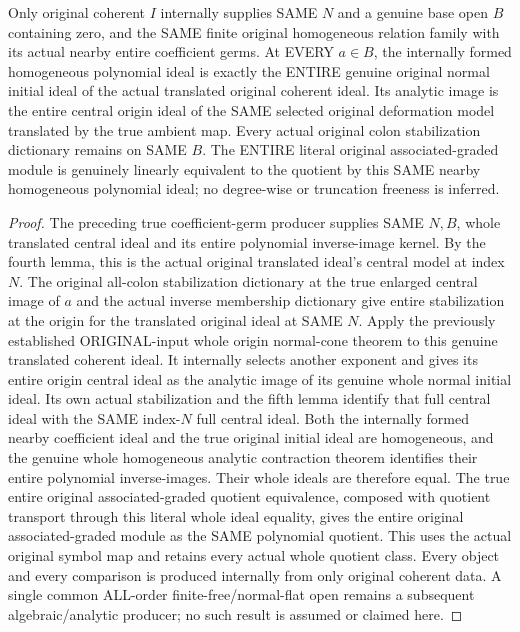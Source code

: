 \begin{theorem}
\label{hir:relative-normal-affine-dnc-original-nearby-cone}
\leanok
Only original coherent $I$ internally supplies SAME $N$ and a genuine base open $B$ containing zero, and the SAME finite original homogeneous relation family with its actual nearby entire coefficient germs. At EVERY $a\in B$, the internally formed homogeneous polynomial ideal is exactly the ENTIRE genuine original normal initial ideal of the actual translated original coherent ideal. Its analytic image is the entire central origin ideal of the SAME selected original deformation model translated by the true ambient map. Every actual original colon stabilization dictionary remains on SAME $B$. The ENTIRE literal original associated-graded module is genuinely linearly equivalent to the quotient by this SAME nearby homogeneous polynomial ideal; no degree-wise or truncation freeness is inferred.
\end{theorem}
\begin{proof}
The preceding true coefficient-germ producer supplies SAME $N,B$, whole translated central ideal and its entire polynomial inverse-image kernel. By the fourth lemma, this is the actual original translated ideal's central model at index $N$. The original all-colon stabilization dictionary at the true enlarged central image of $a$ and the actual inverse membership dictionary give entire stabilization at the origin for the translated original ideal at SAME $N$. Apply the previously established ORIGINAL-input whole origin normal-cone theorem to this genuine translated coherent ideal. It internally selects another exponent and gives its entire origin central ideal as the analytic image of its genuine whole normal initial ideal. Its own actual stabilization and the fifth lemma identify that full central ideal with the SAME index-$N$ full central ideal. Both the internally formed nearby coefficient ideal and the true original initial ideal are homogeneous, and the genuine whole homogeneous analytic contraction theorem identifies their entire polynomial inverse-images. Their whole ideals are therefore equal. The true entire original associated-graded quotient equivalence, composed with quotient transport through this literal whole ideal equality, gives the entire original associated-graded module as the SAME polynomial quotient. This uses the actual original symbol map and retains every actual whole quotient class. Every object and every comparison is produced internally from only original coherent data. A single common ALL-order finite-free/normal-flat open remains a subsequent algebraic/analytic producer; no such result is assumed or claimed here.
\end{proof}
